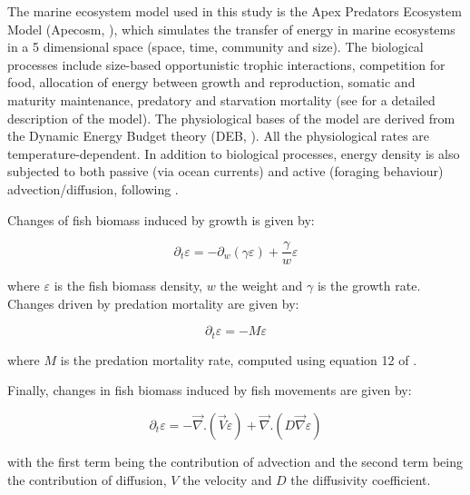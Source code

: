 The marine ecosystem model used in this study is the Apex Predators Ecosystem Model (Apecosm, \citealt{mauryModelingEnvironmentalEffects2007, mauryOverviewAPECOSMSpatialized2010}), which simulates the transfer of energy in marine ecosystems in a 5 dimensional space (space, time, community and size). The biological processes include size-based opportunistic trophic interactions, competition for food, allocation of energy between growth and reproduction, somatic and maturity maintenance, predatory and starvation mortality (see \citealt{mauryModelingEnvironmentalEffects2007} for a detailed description of the model). The physiological bases of the model are derived from the Dynamic Energy Budget theory (DEB, \citealt{kooijmanDynamicEnergyMass2000}). All the physiological rates are temperature-dependent. In addition to biological processes, energy density is also subjected to both passive (via ocean currents) and active (foraging behaviour) advection/diffusion, following \cite{faugerasAdvectiondiffusionreactionSizestructuredFish2005}.

Changes of fish biomass induced by growth is given by:

\begin{equation}
\partial_t \varepsilon = - \partial_w(\gamma \varepsilon) + \frac{\gamma}{w}\varepsilon
\label{eq:growth}
\end{equation}

where $\varepsilon$  is the fish biomass density, $w$ the weight and $\gamma$ is the growth rate. Changes driven by predation mortality are given by:

\begin{equation}
\partial_t \varepsilon = - M \varepsilon
\label{eq:pred}
\end{equation}

where $M$ is the predation mortality rate, computed using equation 12 of \cite{mauryIndividualsPopulationsCommunities2013}. 

Finally, changes in fish biomass induced by fish movements are given by:

\begin{equation}
\partial_t \varepsilon = -\overrightarrow{\nabla}.(\overrightarrow{V} \varepsilon) + \overrightarrow{\nabla} . (D \overrightarrow{\nabla} \varepsilon)
\label{eq:move}
\end{equation}

with the first term being the contribution of advection and the second term being the contribution of diffusion, $V$ the velocity and $D$ the diffusivity coefficient.

